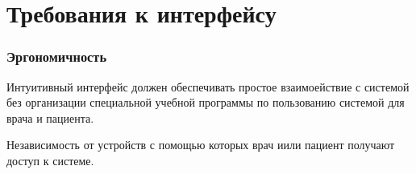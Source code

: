 \section{Требования к интерфейсу}
\subsubsection{Эргономичность}

Интуитивный интерфейс должен обеспечивать простое взаимоействие с системой без
организации специальной учебной программы по пользованию системой для врача и
пациента. 

Независимость от устройств с помощью которых врач иили пациент получают
доступ к системе.
